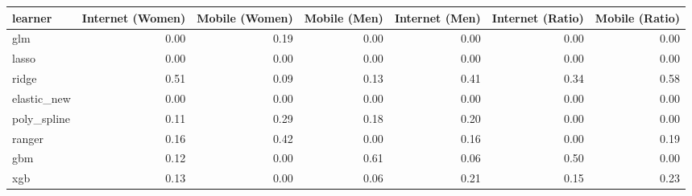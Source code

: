\begin{table}[ht]
\centering
\begin{tabular}{lrrrrrr}
  \toprule
learner & Internet (Women) & Mobile (Women) & Mobile (Men) & Internet (Men) & Internet (Ratio) & Mobile (Ratio) \\ 
  \midrule
glm & 0.00 & 0.19 & 0.00 & 0.00 & 0.00 & 0.00 \\ 
  lasso & 0.00 & 0.00 & 0.00 & 0.00 & 0.00 & 0.00 \\ 
  ridge & 0.51 & 0.09 & 0.13 & 0.41 & 0.34 & 0.58 \\ 
  elastic\_new & 0.00 & 0.00 & 0.00 & 0.00 & 0.00 & 0.00 \\ 
  poly\_spline & 0.11 & 0.29 & 0.18 & 0.20 & 0.00 & 0.00 \\ 
  ranger & 0.16 & 0.42 & 0.00 & 0.16 & 0.00 & 0.19 \\ 
  gbm & 0.12 & 0.00 & 0.61 & 0.06 & 0.50 & 0.00 \\ 
  xgb & 0.13 & 0.00 & 0.06 & 0.21 & 0.15 & 0.23 \\ 
   \bottomrule
\end{tabular}
\end{table}
